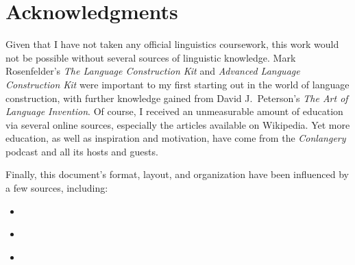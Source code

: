 \chapter{Acknowledgments}
\label{cha:acknowledgments}

Given that I have not taken any official linguistics coursework, this work would not be possible without several sources of linguistic knowledge. Mark Rosenfelder's \textit{The Language Construction Kit} and \textit{Advanced Language Construction Kit} were important to my first starting out in the world of language construction, with further knowledge gained from David J.~Peterson's \textit{The Art of Language Invention}. Of course, I received an unmeasurable amount of education via several online sources, especially the articles available on Wikipedia. Yet more education, as well as inspiration and motivation, have come from the \textit{Conlangery} podcast and all its hosts and guests.

Finally, this document's format, layout, and organization have been influenced by a few sources, including:

\begin{itemize}
	\item \cite{descms}
	\item \cite{ayeri}
	\item \cite{okuna}\\[\baselineskip]
\end{itemize}